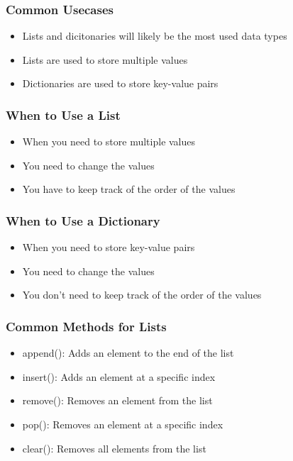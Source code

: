 \documentclass[serif, 9pt, aspectratio=32]{beamer}
\begin{document}
\begin{frame}
    \centering
    \frametitle{Common Usecases}
    \begin{itemize}
        \setlength{\itemsep}{3em}
        \item Lists and dicitonaries will likely be the most used data types
        \item Lists are used to store multiple values
        \item Dictionaries are used to store key-value pairs
    \end{itemize}
\end{frame}

\begin{frame}
    \centering
    \frametitle{When to Use a List}
    \begin{itemize}
        \setlength{\itemsep}{3em}
        \item When you need to store multiple values
        \item You need to change the values
        \item You have to keep track of the order of the values
    \end{itemize}
\end{frame}

\begin{frame}
    \centering
    \frametitle{When to Use a Dictionary}
    \begin{itemize}
        \setlength{\itemsep}{3em}
        \item When you need to store key-value pairs
        \item You need to change the values
        \item You don't need to keep track of the order of the values
    \end{itemize}
\end{frame}

\begin{frame}
    \centering
    \frametitle{Common Methods for Lists}
    \begin{itemize}
        \setlength{\itemsep}{3em}
        \item append(): Adds an element to the end of the list
        \item insert(): Adds an element at a specific index
        \item remove(): Removes an element from the list
        \item pop(): Removes an element at a specific index
        \item clear(): Removes all elements from the list
    \end{itemize}
\end{frame}
\end{document}
